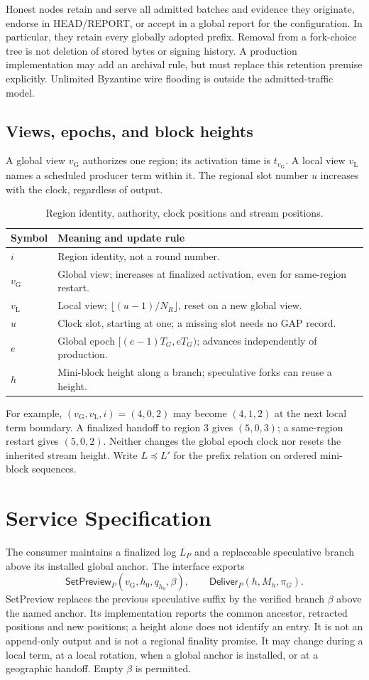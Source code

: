 \documentclass[11pt,a4paper,onecolumn]{article}
\newcommand{\gv}{v_{\mathrm G}}
\newcommand{\lv}{v_{\mathrm L}}
\newcommand{\pre}{\preceq}
\newcommand{\Tag}[1]{\mathsf{#1}}
\theoremstyle{remark}\newtheorem{example}[definition]{Example}
\begin{document}
Honest nodes retain and serve all admitted batches and evidence they originate,
endorse in HEAD/REPORT, or accept in a global report for the configuration.
In particular, they retain every globally adopted prefix. Removal from a
fork-choice tree is not deletion of stored bytes or signing history. A
production implementation may add an archival rule, but must replace this
retention premise explicitly. Unlimited Byzantine wire flooding is outside
the admitted-traffic model.

\subsection{Views, epochs, and block heights}\label{sec:indices}
A global view $\gv$ authorizes one region; its activation time is
$t_{\gv}$. A local view $\lv$ names a scheduled producer term within it.
The regional slot number $u$ increases with the clock, regardless of output.
\begin{table}[H]\centering\small
\begin{tabularx}{\textwidth}{@{}p{}Y@{}}\toprule
Symbol & Meaning and update rule\\\midrule
$i$ & Region identity, not a round number.\\
$\gv$ & Global view; increases at finalized activation, even for same-region restart.\\
$\lv$ & Local view; $\lfloor(u-1)/N_R\rfloor$, reset on a new global view.\\
$u$ & Clock slot, starting at one; a missing slot needs no GAP record.\\
$e$ & Global epoch $[(e-1)T_G,eT_G)$; advances independently of production.\\
$h$ & Mini-block height along a branch; speculative forks can reuse a height.\\
\bottomrule\end{tabularx}
\caption{Region identity, authority, clock positions and stream positions.}
\end{table}
For example, $(\gv,\lv,i)=(4,0,2)$ may become $(4,1,2)$ at the next local
term boundary. A finalized handoff to region 3 gives $(5,0,3)$; a same-region
restart gives $(5,0,2)$. Neither changes the global epoch clock nor resets the
inherited stream height. Write $L\pre L'$ for the prefix relation on ordered
mini-block sequences.

\section{Service Specification}\label{sec:spec}
The consumer maintains a finalized log $L_P$ and a replaceable speculative
branch above its installed global anchor. The interface exports
\[
 \Tag{SetPreview}_P(\gv,h_0,q_{h_0},\beta),\qquad
 \Tag{Deliver}_P(h,M_h,\pi_G).
\]
SetPreview replaces the previous speculative suffix by the verified branch
$\beta$ above the named anchor. Its implementation reports the common ancestor,
retracted positions and new positions; a height alone does not identify an
entry. It is not an append-only output and is not a regional finality promise.
It may change during a local term, at a local rotation, when a global anchor
is installed, or at a geographic handoff. Empty $\beta$ is permitted.
\end{document}
